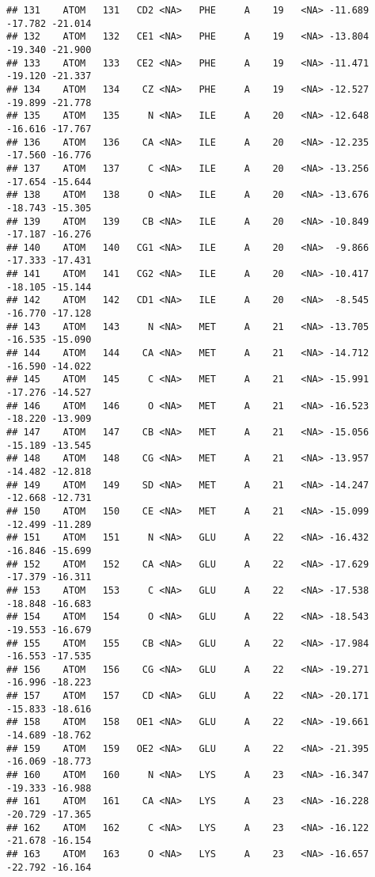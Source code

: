 \documentclass[
]{article}
\begin{document}
\begin{verbatim}
## 131    ATOM   131   CD2 <NA>   PHE     A    19   <NA> -11.689 -17.782 -21.014
## 132    ATOM   132   CE1 <NA>   PHE     A    19   <NA> -13.804 -19.340 -21.900
## 133    ATOM   133   CE2 <NA>   PHE     A    19   <NA> -11.471 -19.120 -21.337
## 134    ATOM   134    CZ <NA>   PHE     A    19   <NA> -12.527 -19.899 -21.778
## 135    ATOM   135     N <NA>   ILE     A    20   <NA> -12.648 -16.616 -17.767
## 136    ATOM   136    CA <NA>   ILE     A    20   <NA> -12.235 -17.560 -16.776
## 137    ATOM   137     C <NA>   ILE     A    20   <NA> -13.256 -17.654 -15.644
## 138    ATOM   138     O <NA>   ILE     A    20   <NA> -13.676 -18.743 -15.305
## 139    ATOM   139    CB <NA>   ILE     A    20   <NA> -10.849 -17.187 -16.276
## 140    ATOM   140   CG1 <NA>   ILE     A    20   <NA>  -9.866 -17.333 -17.431
## 141    ATOM   141   CG2 <NA>   ILE     A    20   <NA> -10.417 -18.105 -15.144
## 142    ATOM   142   CD1 <NA>   ILE     A    20   <NA>  -8.545 -16.770 -17.128
## 143    ATOM   143     N <NA>   MET     A    21   <NA> -13.705 -16.535 -15.090
## 144    ATOM   144    CA <NA>   MET     A    21   <NA> -14.712 -16.590 -14.022
## 145    ATOM   145     C <NA>   MET     A    21   <NA> -15.991 -17.276 -14.527
## 146    ATOM   146     O <NA>   MET     A    21   <NA> -16.523 -18.220 -13.909
## 147    ATOM   147    CB <NA>   MET     A    21   <NA> -15.056 -15.189 -13.545
## 148    ATOM   148    CG <NA>   MET     A    21   <NA> -13.957 -14.482 -12.818
## 149    ATOM   149    SD <NA>   MET     A    21   <NA> -14.247 -12.668 -12.731
## 150    ATOM   150    CE <NA>   MET     A    21   <NA> -15.099 -12.499 -11.289
## 151    ATOM   151     N <NA>   GLU     A    22   <NA> -16.432 -16.846 -15.699
## 152    ATOM   152    CA <NA>   GLU     A    22   <NA> -17.629 -17.379 -16.311
## 153    ATOM   153     C <NA>   GLU     A    22   <NA> -17.538 -18.848 -16.683
## 154    ATOM   154     O <NA>   GLU     A    22   <NA> -18.543 -19.553 -16.679
## 155    ATOM   155    CB <NA>   GLU     A    22   <NA> -17.984 -16.553 -17.535
## 156    ATOM   156    CG <NA>   GLU     A    22   <NA> -19.271 -16.996 -18.223
## 157    ATOM   157    CD <NA>   GLU     A    22   <NA> -20.171 -15.833 -18.616
## 158    ATOM   158   OE1 <NA>   GLU     A    22   <NA> -19.661 -14.689 -18.762
## 159    ATOM   159   OE2 <NA>   GLU     A    22   <NA> -21.395 -16.069 -18.773
## 160    ATOM   160     N <NA>   LYS     A    23   <NA> -16.347 -19.333 -16.988
## 161    ATOM   161    CA <NA>   LYS     A    23   <NA> -16.228 -20.729 -17.365
## 162    ATOM   162     C <NA>   LYS     A    23   <NA> -16.122 -21.678 -16.154
## 163    ATOM   163     O <NA>   LYS     A    23   <NA> -16.657 -22.792 -16.164

\end{verbatim}
\end{document}
